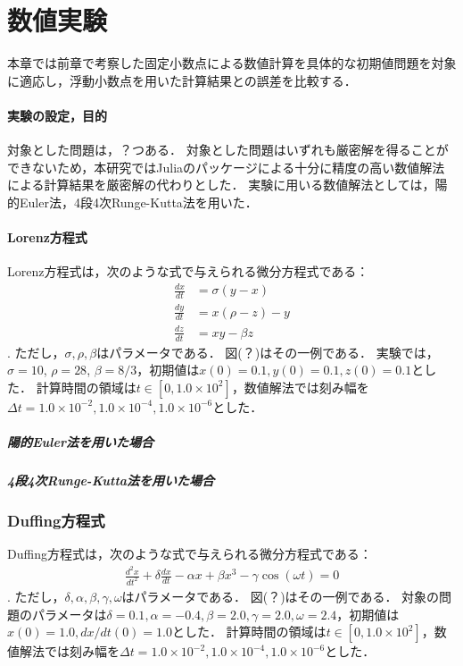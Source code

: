 \chapter{数値実験}
本章では前章で考察した固定小数点による数値計算を具体的な初期値問題を対象に適応し，浮動小数点を用いた計算結果との誤差を比較する．

\subsubsection{実験の設定，目的}
対象とした問題は，？つある．
対象とした問題はいずれも厳密解を得ることができないため，本研究ではJuliaのパッケージによる十分に精度の高い数値解法による計算結果を厳密解の代わりとした．
実験に用いる数値解法としては，陽的Euler法，4段4次Runge-Kutta法を用いた．

\subsubsection{Lorenz方程式}
Lorenz方程式は，次のような式で与えられる微分方程式である：
\begin{align}
    \frac{dx}{dt} &= \sigma(y-x) \\
    \frac{dy}{dt} &= x(\rho-z)-y \\
    \frac{dz}{dt} &= xy - \beta z
\end{align}.
ただし，$\sigma,\rho,\beta$はパラメータである．
図(？)はその一例である．
実験では，$\sigma=10$, $\rho=28$, $\beta=8/3$，初期値は$x(0) = 0.1, y(0) = 0.1, z(0) = 0.1$とした．
計算時間の領域は$t \in [0,1.0 \times 10^2]$，数値解法では刻み幅を$\Delta t =  1.0 \times 10^{-2},1.0 \times 10^{-4}, 1.0 \times 10^{-6}$とした．
\paragraph*{陽的Euler法を用いた場合}

\paragraph*{4段4次Runge-Kutta法を用いた場合}

\subsection{Duffing方程式}
Duffing方程式は，次のような式で与えられる微分方程式である：
\begin{align}
    \frac{d^2 x}{dt^2} + \delta\frac{dx}{dt} - \alpha x + \beta x^3 - \gamma \cos(\omega t) = 0
\end{align}.
ただし，$\delta,\alpha,\beta,\gamma,\omega$はパラメータである．
図(？)はその一例である．
対象の問題のパラメータは$\delta=0.1, \alpha=-0.4, \beta=2.0, \gamma=2.0, \omega=2.4$，初期値は$x(0) = 1.0, dx/dt(0) = 1.0$とした．
計算時間の領域は$t \in [0,1.0 \times 10^2]$，数値解法では刻み幅を$\Delta t =  1.0 \times 10^{-2},1.0 \times 10^{-4}, 1.0 \times 10^{-6}$とした．
